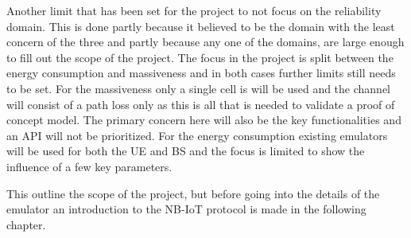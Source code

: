 Another limit that has been set for the project to not focus on the reliability domain. This is done partly because it believed to be the domain with the least concern of the three and partly because any one of the domains, are large enough to fill out the scope of the project. The focus in the project is split between the energy consumption and massiveness and in both cases further limits still needs to be set. For the massiveness only a single cell is will be used and the channel will consist of a path loss only as this is all that is needed to validate a proof of concept model. The primary concern here will also be the key functionalities and an API will not be prioritized. For the energy consumption existing emulators will be used for both the UE and BS and the focus is limited to show the influence of a few key parameters. %

This outline the scope of the project, but before going into the details of the emulator an introduction to the \gls{NB-IoT} protocol is made in the following chapter.









 


